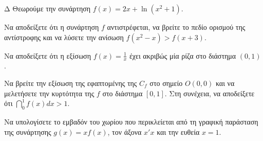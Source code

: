 \begin{thema}{Δ}
Θεωρούμε την συνάρτηση $f(x) = 2x + \ln(x^2+1)$.
\begin{erwthma}
    \item Να αποδείξετε ότι η συνάρτηση $f$ αντιστρέφεται, να βρείτε το πεδίο ορισμού της αντίστροφης και να λύσετε την ανίσωση $f(x^2-x) > f(x+3)$.
    \item Να αποδείξετε ότι η εξίσωση $\displaystyle f(x) = \frac{1}{x}$ έχει ακριβώς μία ρίζα στο διάστημα $(0, 1)$.
    \item Να βρείτε την εξίσωση της εφαπτομένης της $C_f$ στο σημείο $O(0,0)$ και να μελετήσετε την κυρτότητα της $f$ στο διάστημα $[0, 1]$. Στη συνέχεια, να αποδείξετε ότι $\displaystyle \dint_0^1 f(x) dx > 1$.
    \item Να υπολογίσετε το εμβαδόν του χωρίου που περικλείεται από τη γραφική παράσταση της συνάρτησης $g(x) = x f(x)$, τον άξονα $x'x$ και την ευθεία $x=1$.
\end{erwthma}
\end{thema}
